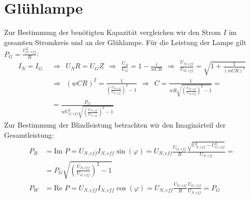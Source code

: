 \documentclass[a4paper,12pt]{article}
\begin{document}
\section{Glühlampe}
Zur Bestimmung der benötigten Kapazität vergleichen wir den Strom $I$ im gesamten Stromkreis und an der Glühlampe. Für die Leistung der Lampe gilt $P_G=\frac{U_{G,eff}^2}{R}$:
\begin{align*}
I_N=I_G\ \ &\Rightarrow\ \ U_NR=U_GZ\ \ \Rightarrow\ \ \frac{U_N}{U_G}=1-\frac{i}{wCR}\ \ \Rightarrow\ \ \frac{U_{N,eff}}{U_{G,eff}}=\sqrt{1+\frac{1}{(wCR)^2}}\\ 
&\Rightarrow\ \ (wCR)^2=\frac{1}{\left(\frac{U_{N,eff}}{U_{G,eff}}\right)^2-1}\ \ \Rightarrow\ \ C=\frac{1}{wR\sqrt{\left(\frac{U_{N,eff}}{U_{G,eff}}\right)^2-1}}=\\
&=\frac{P_G}{wU_{G,eff}^2\sqrt{\left(\frac{U_{N,eff}}{U_{G,eff}}\right)^2-1}}
\end{align*}
Zur Bestimmung der Blindleistung betrachten wir den Imaginärteil der Gesamtleistung:
\begin{align*}
P_B&=\textrm{Im }P= U_{N,eff}I_{N,eff}\sin(\varphi)=U_{N,eff}\frac{U_{G,eff}}{R}\frac{\sqrt{U_{N,eff}^2-U_{G,eff}^2}}{U_{N,eff}}=\\
&=P_G\sqrt{\left(\frac{U_{N,eff}}{U_{G,eff}}\right)^2-1}\\
P_W&=\textrm{Re }P=U_{N,eff}I_{N,eff}\cos(\varphi)=U_{N,eff}\frac{U_{G,eff}}{R}\frac{U_{G,eff}}{U_{N,eff}}=P_G
\end{align*}
\end{document}
